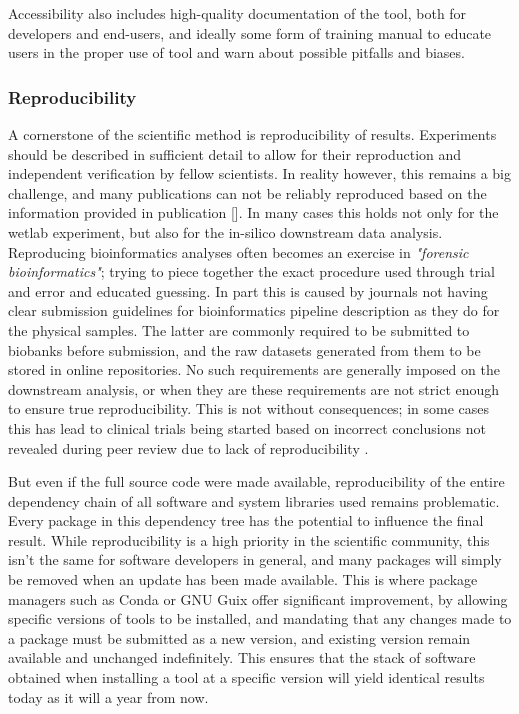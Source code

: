 Accessibility also includes high-quality documentation of the tool, both for developers and end-users, and ideally some form of training manual to educate users in the proper use of tool and warn about possible pitfalls and biases.

\subsubsection{Reproducibility}

A cornerstone of the scientific method is reproducibility of results. Experiments should be described in sufficient detail to allow for their reproduction and independent verification by fellow scientists. In reality however, this remains a big challenge, and many publications can not be reliably reproduced based on the information provided in publication []. In many cases this holds not only for the wetlab experiment, but also for the in-silico downstream data analysis. Reproducing bioinformatics analyses often becomes an exercise in \textit{"forensic bioinformatics"}; trying to piece together the exact procedure used through trial and error and educated guessing. In part this is caused by journals not having clear submission guidelines for bioinformatics pipeline description as they do for the physical samples. The latter are commonly required to be submitted to biobanks before submission, and the raw datasets generated from them to be stored in online repositories. No such requirements are generally imposed on the downstream analysis, or when they are these requirements are not strict enough to ensure true reproducibility. This is not without consequences; in some cases this has lead to clinical trials being started based on incorrect conclusions not revealed during peer review due to lack of reproducibility \cite{baggerly2009reproducible}.

But even if the full source code were made available, reproducibility of the entire dependency chain of all software and system libraries used remains problematic. Every package in this dependency tree has the potential to influence the final result. While reproducibility is a high priority in the scientific community, this isn't the same for software developers in general, and many packages will simply be removed when an update has been made available. This is where package managers such as Conda \cite{gruning2017bioconda} or GNU Guix \cite{courtes2013functional} offer significant improvement, by allowing specific versions of tools to be installed, and mandating that any changes made to a package must be submitted as a new version, and existing version remain available and unchanged indefinitely. This ensures that the stack of software obtained when installing a tool at a specific version will yield identical results today as it will a year from now.

